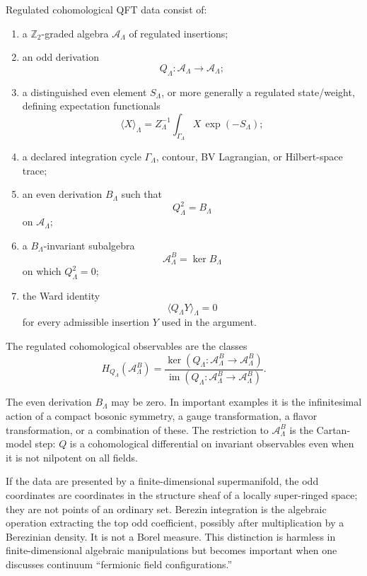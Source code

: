 \begin{definition}
\label{def:regulated-cohomological-qft-data}
Regulated cohomological QFT data consist of:
\begin{enumerate}[label=(\roman*)]
\item a \(\mathbb Z_2\)-graded algebra
  \(\mathcal A_\Lambda\) of regulated insertions;
\item an odd derivation
  \[
    Q_\Lambda:\mathcal A_\Lambda\to\mathcal A_\Lambda;
  \]
\item a distinguished even element \(S_\Lambda\), or more generally a
  regulated state/weight, defining expectation functionals
  \[
    \langle X\rangle_\Lambda
    =
    Z_\Lambda^{-1}\int_{\Gamma_\Lambda} X\,\exp(-S_\Lambda);
  \]
\item a declared integration cycle \(\Gamma_\Lambda\), contour, BV
  Lagrangian, or Hilbert-space trace;
\item an even derivation \(B_\Lambda\) such that
  \begin{equation}
    Q_\Lambda^2=B_\Lambda
    \label{eq:cohomological-q-square-b}
  \end{equation}
  on \(\mathcal A_\Lambda\);
\item a \(B_\Lambda\)-invariant subalgebra
  \[
    \mathcal A_\Lambda^{B}
    =
    \ker B_\Lambda
  \]
  on which \(Q_\Lambda^2=0\);
\item the Ward identity
  \begin{equation}
    \langle Q_\Lambda Y\rangle_\Lambda=0
    \label{eq:regulated-q-ward-identity}
  \end{equation}
  for every admissible insertion \(Y\) used in the argument.
\end{enumerate}
The regulated cohomological observables are the classes
\[
  H_{Q_\Lambda}(\mathcal A_\Lambda^{B})
  =
  \frac{\ker(Q_\Lambda:\mathcal A_\Lambda^B\to\mathcal A_\Lambda^B)}
       {\operatorname{im}(Q_\Lambda:\mathcal A_\Lambda^B\to\mathcal A_\Lambda^B)} .
\]
\end{definition}

The even derivation \(B_\Lambda\) may be zero.  In important examples it is
the infinitesimal action of a compact bosonic symmetry, a gauge
transformation, a flavor transformation, or a combination of these.  The
restriction to \(\mathcal A_\Lambda^B\) is the Cartan-model step: \(Q\) is a
cohomological differential on invariant observables even when it is not
nilpotent on all fields.

If the data are presented by a finite-dimensional supermanifold, the odd
coordinates are coordinates in the structure sheaf of a locally
super-ringed space; they are not points of an ordinary set.  Berezin
integration is the algebraic operation extracting the top odd coefficient,
possibly after multiplication by a Berezinian density.  It is not a Borel
measure.  This distinction is harmless in finite-dimensional algebraic
manipulations but becomes important when one discusses continuum
``fermionic field configurations.''


